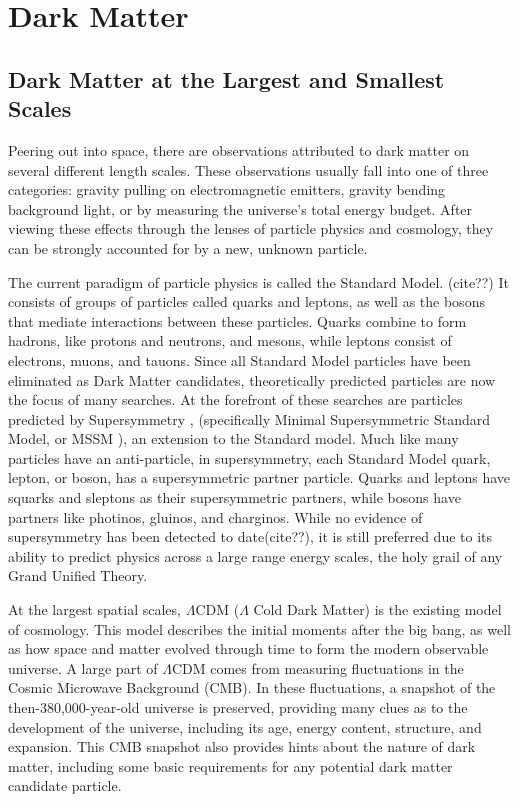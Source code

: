 \cleartooddpage[\thispagestyle{empty}]
\chapter{Dark Matter}

\section{Dark Matter at the Largest and Smallest Scales} %
  Peering out into space, there are observations attributed to dark matter on several different length scales.
  These observations usually fall into one of three categories: gravity pulling on electromagnetic emitters, gravity bending background light, or by measuring the universe's total energy budget.
  After viewing these effects through the lenses of particle physics and cosmology, they can be strongly accounted for by a new, unknown particle.

  The current paradigm of particle physics is called the Standard Model. (cite??)
  It consists of groups of particles called quarks and leptons, as well as the bosons that mediate interactions between these particles.
  Quarks combine to form hadrons, like protons and neutrons, and mesons, while leptons consist of electrons, muons, and tauons.
  Since all Standard Model particles have been eliminated as Dark Matter candidates, theoretically predicted particles are now the focus of many searches.
  At the forefront of these searches are particles predicted by Supersymmetry \cite{Jungman}, (specifically Minimal Supersymmetric Standard Model, or MSSM \cite{MSSM}), an extension to the Standard model.
  Much like many particles have an anti-particle, in supersymmetry, each Standard Model quark, lepton, or boson, has a supersymmetric partner particle.
  Quarks and leptons have squarks and sleptons as their supersymmetric partners, while bosons have partners like photinos, gluinos, and charginos.
  While no evidence of supersymmetry has been detected to date(cite??), it is still preferred due to its ability to predict physics across a large range energy scales, the holy grail of any Grand Unified Theory.

  At the largest spatial scales, $\Lambda$CDM ($\Lambda$ Cold Dark Matter) is the existing model of cosmology.
  This model describes the initial moments after the big bang, as well as how space and matter evolved through time to form the modern observable universe.
  A large part of $\Lambda$CDM comes from measuring fluctuations in the Cosmic Microwave Background (CMB).
  In these fluctuations, a snapshot of the then-380,000-year-old universe is preserved, providing many clues as to the development of the universe, including its age, energy content, structure, and expansion. %
  This CMB snapshot also provides hints about the nature of dark matter, including some basic requirements for any potential dark matter candidate particle.

